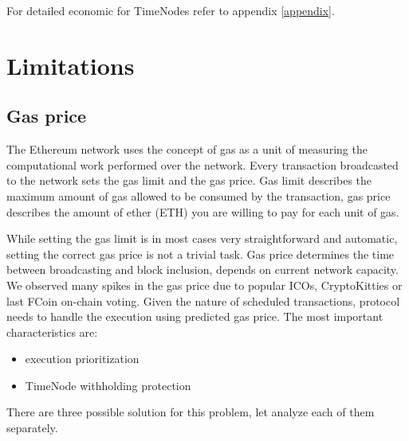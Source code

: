\documentclass{report}
\begin{document}
  For detailed economic for TimeNodes refer to appendix \ref{appendix}.
  \section{Limitations}
  \subsection{Gas price}
  The Ethereum network uses the concept of gas as a unit of measuring the computational work performed over the network. Every transaction broadcasted to the network sets the gas limit and the gas price. Gas limit describes the maximum amount of gas allowed to be consumed by the transaction, gas price describes the amount of ether (ETH) you are willing to pay for each unit of gas.

  While setting the gas limit is in most cases very straightforward and automatic, setting the correct gas price is not a trivial task. Gas price determines the time between broadcasting and block inclusion, depends on current network capacity. We observed many spikes in the gas price due to popular ICOs, CryptoKitties or last FCoin on-chain voting.
Given the nature of scheduled transactions, protocol needs to handle the execution using predicted gas price. The most important characteristics are:
  \begin{itemize}
    \item execution prioritization
    \item TimeNode withholding protection
  \end{itemize}

  There are three possible solution for this problem, let analyze each of them separately.
\end{document}
